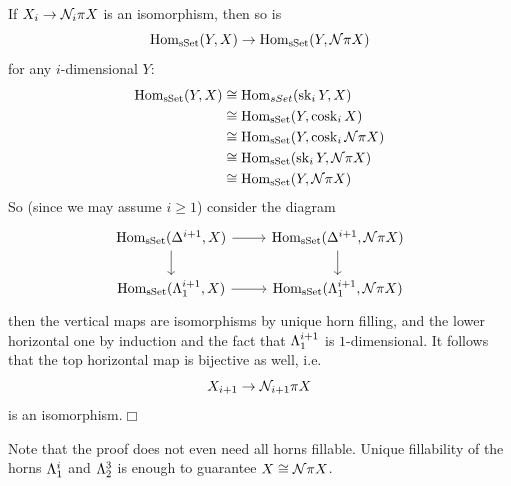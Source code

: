         If $X_i \to \mathcal{N}_i \pi X$ is an isomorphism, then so is
        \begin{equation*}
            \operatorname{Hom}_{\operatorname{sSet}}(Y, X) \to \operatorname{Hom}_{\operatorname{sSet}}(Y, \mathcal{N} \pi X)
        \end{equation*}
        for any $i$-dimensional $Y$:
        \begin{align*}
            \operatorname{Hom}_{\operatorname{sSet}}(Y, X) &\cong \operatorname{Hom}_{sSet}(\operatorname{sk}_i Y, X) \\
                             &\cong \operatorname{Hom}_{\operatorname{sSet}}(Y, \operatorname{cosk}_i X) \\
                             &\cong \operatorname{Hom}_{\operatorname{sSet}}(Y, \operatorname{cosk}_i \mathcal{N} \pi X) \\
                             &\cong \operatorname{Hom}_{\operatorname{sSet}}(\operatorname{sk}_i Y, \mathcal{N} \pi X) \\
                             &\cong \operatorname{Hom}_{\operatorname{sSet}}(Y, \mathcal{N} \pi X)
        \end{align*}
        So (since we may assume $i \geq 1$) consider the diagram
        \begin{equation*}
            \begin{tikzcd}
                \Hom_{\sSet}(\Delta^{i+1}, X) \arrow[r] \arrow[d] & \Hom_{\sSet}(\Delta^{i+1}, \Nn \pi X) \arrow[d] \\
                \Hom_{\sSet}(\horn{i+1}{1}, X) \arrow[r] & \Hom_{\sSet}(\horn{i+1}{1}, \Nn \pi X)
            \end{tikzcd}
        \end{equation*}
        then the vertical maps are isomorphisms by unique horn filling, and the lower horizontal one by induction and the fact that $\Lambda^{i+1}_{1}$ is $1$-dimensional. It follows that the top horizontal map is bijective as well, i.e.
        \begin{equation*}
            X_{i+1} \to \mathcal{N}_{i+1} \pi X
        \end{equation*}
        is an isomorphism.\hfill$\Box$
        \medskip

        Note that the proof does not even need all horns fillable. Unique fillability of the horns $\Lambda^{i}_{1}$ and $\Lambda^{3}_{2}$ is enough to guarantee $X \cong \mathcal{N} \pi X$.        